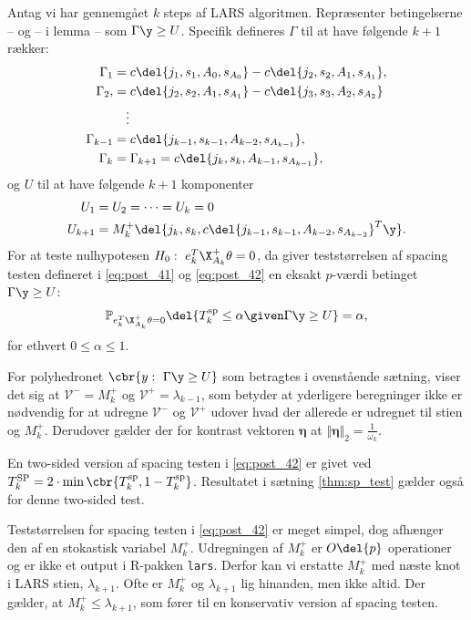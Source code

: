 %
\begin{thm} \label{thm:sp_test}
Antag vi har gennemgået \(k\) steps af LARS algoritmen.
Repræsenter betingelserne -- og -- i lemma -- som \(\Gamma \y \geq U\).
Specifik defineres \(\Gamma\) til at have følgende \(k + 1 \) rækker:
\begin{align*}
\Gamma_1 &= c \del{j_1, s_1, A_0, s_{A_0}} - c \del{j_2, s_2, A_1, s_{A_1}}, \\
\Gamma_2, &= c \del{j_2, s_2, A_1, s_{A_1}} - c \del{j_3, s_3, A_2, s_{A_2}} \\
& \quad \vdots \\
\Gamma_{k-1} &= c \del{j_{k-1}, s_{k-1}, A_{k-2}, s_{A_{k-1}}}, \\
 \Gamma_k &= \Gamma_{k+1} = c \del{j_k, s_k, A_{k-1}, s_{A_{k-1}}},
\end{align*}
og \(U\) til at have følgende \(k+1\) komponenter
\begin{align*}
U_1 &= U_2 = \dots = U_k = 0 \\
U_{k+1} &= M_k^+ \del{j_k, s_k, c \del{j_{k-1}, s _{k-1}, A_{k-2}, s_{A_{k-2}}}^T \y}.
\end{align*}
For at teste nulhypotesen \(H_0: \ e_k^T \X_{A_k}^+ \theta = 0\), da giver teststørrelsen af spacing testen defineret i \eqref{eq:post_41} og \eqref{eq:post_42} en eksakt \(p\)-værdi betinget \(\Gamma \y \geq U\):
\begin{align*}
\mathbb{P}_{e_k^T \X_{A_k}^+ \theta = 0} \del{T_k^\text{sp} \leq \alpha \given \Gamma \y \geq U} = \alpha,
\end{align*}
for ethvert \(0 \leq \alpha \leq 1\).
\end{thm}
%
For polyhedronet \(\cbr{y: \ \Gamma \y \geq U}\) som betragtes i ovenstående sætning, viser det sig at \(\mathcal{V}^- = M_k^+\) og \(\mathcal{V}^+=\lambda_{k-1}\), som betyder at yderligere beregninger ikke er nødvendig for at udregne \(\mathcal{V}^-\) og \(\mathcal{V}^+\) udover hvad der allerede er udregnet til stien og \(M_k^+\).
Derudover gælder der for kontrast vektoren \(\boldsymbol{\eta}\) at \(\Vert \boldsymbol{\eta} \Vert_2 = \frac{1}{\omega_k}\).

En two-sided version af spacing testen i \eqref{eq:post_42} er givet ved \(T_k^\text{SP} = 2 \cdot \min \cbr{T_k^\text{sp}, 1 - T_k^\text{sp}}\).
Resultatet i sætning \ref{thm:sp_test} gælder også for denne two-sided test.

Teststørrelsen for spacing testen i \eqref{eq:post_42} er meget simpel, dog afhænger den af en stokastisk variabel \(M_k^+\).
Udregningen af \(M_k^+\) er \(O\del{p}\) operationer og er ikke et output i R-pakken \texttt{lars}.
Derfor kan vi erstatte \(M_k^+\) med næste knot i LARS stien, \(\lambda_{k+1}\).
Ofte er \(M_k^+\) og \(\lambda_{k+1}\) lig hinanden, men ikke altid.
Der gælder, at \(M_k^+ \leq \lambda_{k+1}\), som fører til en konservativ version af spacing testen.

